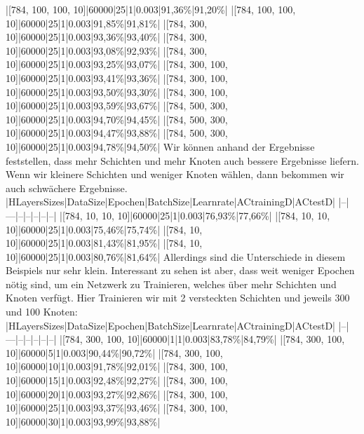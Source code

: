 \documentclass[12pt]{article}
\begin{document}
|[784, 100, 100, 10]|60000|25|1|0.003|91,36\%|91,20\%|
|[784, 100, 100, 10]|60000|25|1|0.003|91,85\%|91,81\%|
|[784, 300, 10]|60000|25|1|0.003|93,36\%|93,40\%|
|[784, 300, 10]|60000|25|1|0.003|93,08\%|92,93\%|
|[784, 300, 10]|60000|25|1|0.003|93,25\%|93,07\%|
|[784, 300, 100, 10]|60000|25|1|0.003|93,41\%|93,36\%|
|[784, 300, 100, 10]|60000|25|1|0.003|93,50\%|93,30\%|
|[784, 300, 100, 10]|60000|25|1|0.003|93,59\%|93,67\%|
|[784, 500, 300, 10]|60000|25|1|0.003|94,70\%|94,45\%|
|[784, 500, 300, 10]|60000|25|1|0.003|94,47\%|93,88\%|
|[784, 500, 300, 10]|60000|25|1|0.003|94,78\%|94,50\%|
Wir können anhand der Ergebnisse feststellen, dass mehr Schichten und mehr Knoten auch bessere Ergebnisse liefern. Wenn wir kleinere Schichten und weniger Knoten wählen, dann bekommen wir auch schwächere Ergebnisse.
|HLayersSizes|DataSize|Epochen|BatchSize|Learnrate|ACtrainingD|ACtestD|
|--|---|--|--|--|--|--|
|[784, 10, 10, 10]|60000|25|1|0.003|76,93\%|77,66\%|
|[784, 10, 10, 10]|60000|25|1|0.003|75,46\%|75,74\%|
|[784, 10, 10]|60000|25|1|0.003|81,43\%|81,95\%|
|[784, 10, 10]|60000|25|1|0.003|80,76\%|81,64\%|
	Allerdings sind die Unterschiede in diesem Beispiels nur sehr klein. Interessant zu sehen ist aber, dass weit weniger Epochen nötig sind, um ein Netzwerk zu Trainieren, welches über mehr Schichten und Knoten verfügt. Hier Trainieren wir mit 2 versteckten Schichten und jeweils 300 und 100 Knoten:
|HLayersSizes|DataSize|Epochen|BatchSize|Learnrate|ACtrainingD|ACtestD|
|--|---|--|--|--|--|--|
|[784, 300, 100, 10]|60000|1|1|0.003|83,78\%|84,79\%|
|[784, 300, 100, 10]|60000|5|1|0.003|90,44\%|90,72\%|
|[784, 300, 100, 10]|60000|10|1|0.003|91,78\%|92,01\%|
|[784, 300, 100, 10]|60000|15|1|0.003|92,48\%|92,27\%|
|[784, 300, 100, 10]|60000|20|1|0.003|93,27\%|92,86\%|
|[784, 300, 100, 10]|60000|25|1|0.003|93,37\%|93,46\%|
|[784, 300, 100, 10]|60000|30|1|0.003|93,99\%|93,88\%|
\end{document}
